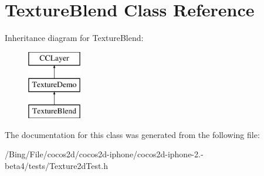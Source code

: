 \hypertarget{interface_texture_blend}{\section{Texture\-Blend Class Reference}
\label{interface_texture_blend}
}
Inheritance diagram for Texture\-Blend\-:\begin{figure}[H]
\begin{center}
\leavevmode
\includegraphics[height=3.000000cm]{interface_texture_blend}
\end{center}
\end{figure}


The documentation for this class was generated from the following file\-:\begin{DoxyCompactItemize}
\item 
/\-Bing/\-File/cocos2d/cocos2d-\/iphone/cocos2d-\/iphone-\/2.-\/beta4/tests/Texture2d\-Test.\-h\end{DoxyCompactItemize}
